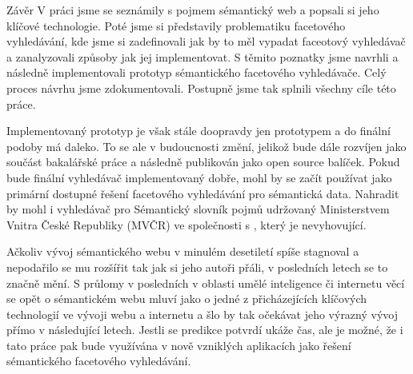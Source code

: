 \chap Závěr
V práci jsme se seznámily s pojmem sémantický web a popsali si jeho klíčové technologie. 
Poté jsme si představily problematiku facetového vyhledávání, kde jsme si zadefinovali jak by to měl vypadat faceotový vyhledávač a zanalyzovali způsoby jak jej implementovat.
S těmito poznatky jsme navrhli a následně implementovali prototyp sémantického facetového vyhledávače. Celý proces návrhu jsme zdokumentovali.
Postupně jsme tak splnili všechny cíle této práce.

Implementovaný prototyp je však stále doopravdy jen prototypem a do finální podoby má daleko. 
To se ale v budoucnosti změní, jelikož bude dále rozvíjen jako součást bakalářské práce a následně publikován jako open source balíček. 
Pokud bude finální vyhledávač implementovaný dobře, mohl by se začít používat jako primární dostupné řešení facetového vyhledávání pro sémantická data.
Nahradit by mohl i vyhledávač pro Sémantický slovník pojmů udržovaný Ministerstvem Vnitra České Republiky (MVČR) ve společnosti s  , který je nevyhovující.

Ačkoliv vývoj sémantického webu v minulém desetiletí spíše stagnoval a nepodařilo se mu rozšířit tak jak si jeho autoři přáli, v posledních letech se to značně mění.
S průlomy v posledních v oblasti umělé inteligence či internetu věcí se opět o sémantickém webu mluví jako o jedné z přicházejících klíčových technologií ve vývoji webu a internetu a šlo by tak očekávat jeho výrazný vývoj přímo v následující letech.
Jestli se predikce potvrdí ukáže čas, ale je možné, že i tato práce pak bude využívána v nově vzniklých aplikacích jako řešení sémantického facetového vyhledávání.
